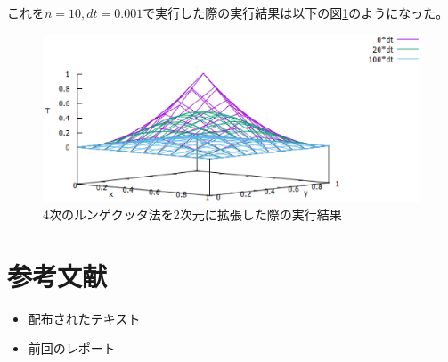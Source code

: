 \documentclass{jsarticle}
\begin{document}
これを$n=10,dt=0.001$で実行した際の実行結果は以下の図\ref{fig06}のようになった。
\begin{figure}[H]
	\centering
	\includegraphics[width=14cm]{pic09.eps}
	\caption{4次のルンゲクッタ法を2次元に拡張した際の実行結果}
	\label{fig06}
\end{figure}



\section{参考文献}

\begin{itemize}
  \item 配布されたテキスト
  \item 前回のレポート
\end{itemize}
\end{document}
